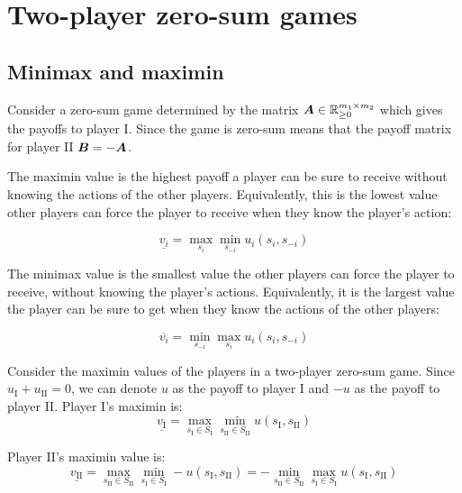 \section{Two-player zero-sum games}

\subsection{Minimax and maximin}

\label{sec:TPZSgames}

Consider a zero-sum game determined by the matrix $\bm{A} \in \mathbb{R}^{m_1
\times m_2}_{\ge 0}$ which gives the payoffs to player I. Since the game is
zero-sum means that the payoff matrix for player II $\bm{B} = -\bm{A}$.

\begin{definition}
	The maximin value is the highest payoff a player can be sure to receive
	without knowing the actions of the other players. Equivalently, this is the
	lowest value other players can force the player to receive when they know
	the player's action:

	\begin{equation}
		\underline{v_i} = \max_{s_i} \min_{s_{-i}} u_i(s_i, s_{-i})
	\end{equation}
\end{definition}

\begin{definition}
	The minimax value is the smallest value the other players can force the
	player to receive, without knowing the player's actions. Equivalently, it
	is the largest value the player can be sure to get when they know the
	actions of the other players:

	\begin{equation}
		\overline{v_i} = \min_{s_{-i}} \max_{s_i} u_i(s_i, s_{-i})
	\end{equation}
\end{definition}

Consider the maximin values of the players in a two-player zero-sum game. Since
$u_\text{I}+u_\text{II}=0$, we can denote $u$ as the payoff to player I and
$-u$ as the payoff to player II. Player I's maximin is:
\begin{equation*}
	\underline{v_\text{I}} = \max_{s_\text{I} \in S_\text{I}} \min_{s_\text{II}
	\in S_\text{II}} u(s_\text{I}, s_\text{II})
\end{equation*}

Player II's maximin value is:
\begin{equation*}
		\underline{v_\text{II}} = \max_{s_\text{II} \in S_\text{II}}
		\min_{s_\text{I} \in S_\text{I}} -u(s_\text{I}, s_\text{II}) = -
		\min_{s_\text{II} \in S_\text{II}} \max_{s_\text{I} \in S_\text{I}}
		u(s_\text{I}, s_\text{II})
\end{equation*}

